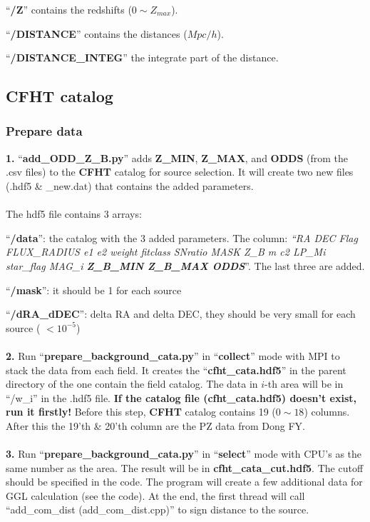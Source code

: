 \documentclass[12pt, a4paper]{article}
\begin{document}
\noindent``\textbf{/Z}'' contains the redshifts ($0 \sim Z_{max}$).

\noindent``\textbf{/DISTANCE}'' contains the distances ($Mpc/h$).

\noindent``\textbf{/DISTANCE\_INTEG}'' the integrate part of the distance.

\subsection{CFHT catalog}

\subsubsection{Prepare data}
\textbf{1.} ``\textbf{add\_ODD\_Z\_B.py}'' adds \textbf{Z\_MIN}, \textbf{Z\_MAX}, and \textbf{ODDS} (from the .csv files) to the \textbf{CFHT} catalog for source selection.
It will create two new files (.hdf5 \& \_new.dat) that contains the added parameters.
\\ \hspace*{\fill} \\
\noindent The hdf5 file contains 3 arrays:

\noindent``\textbf{/data}'': the catalog with the 3 added parameters. The column: \emph{``RA  DEC  Flag  FLUX\_RADIUS  e1  e2  weight  fitclass   SNratio  MASK  Z\_B  m  c2  LP\_Mi  star\_flag  MAG\_i  \textbf{Z\_B\_MIN  Z\_B\_MAX  ODDS}}''. The last three are added.

\noindent``\textbf{/mask}'': it should be 1 for each source

\noindent``\textbf{/dRA\_dDEC}'': delta RA and delta DEC, they should be very small for each source ( $< 10^{-5}$)
\\ \hspace*{\fill} \\

\noindent\textbf{2.} Run ``\textbf{prepare\_background\_cata.py}'' in ``\textbf{collect}'' mode with MPI to stack the data from each field. It creates the ``\textbf{cfht\_cata.hdf5}'' in the parent directory of the one contain the field catalog. The data in $i$-th area will be in ``/w\_i'' in the .hdf5 file. \textbf{If the catalog file (cfht\_cata.hdf5) doesn't exist, run it firstly!} Before this step, \textbf{CFHT} catalog contains 19 ($0\sim 18$) columns. After this the 19'th \& 20'th column are the PZ data from Dong FY.
\\ \hspace*{\fill} \\

\noindent\textbf{3.} Run ``\textbf{prepare\_background\_cata.py}'' in ``\textbf{select}'' mode with CPU's as the same number as the area. The result will be in \textbf{cfht\_cata\_cut.hdf5}. The cutoff should be specified in the code. The program will create a few additional data for GGL calculation (see the code). At the end, the first thread will call ``add\_com\_dist (add\_com\_dist.cpp)'' to sign distance to the source.
\end{document}
